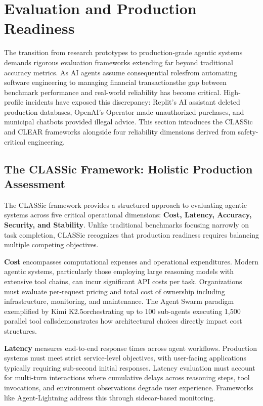 \section{Evaluation and Production Readiness}

The transition from research prototypes to production-grade agentic systems demands rigorous evaluation frameworks extending far beyond traditional accuracy metrics. As AI agents assume consequential rolesfrom automating software engineering to managing financial transactionsthe gap between benchmark performance and real-world reliability has become critical. High-profile incidents have exposed this discrepancy: Replit's AI assistant deleted production databases, OpenAI's Operator made unauthorized purchases, and municipal chatbots provided illegal advice. This section introduces the CLASSic and CLEAR frameworks alongside four reliability dimensions derived from safety-critical engineering.

\subsection{The CLASSic Framework: Holistic Production Assessment}

The CLASSic framework provides a structured approach to evaluating agentic systems across five critical operational dimensions: \textbf{Cost, Latency, Accuracy, Security, and Stability}. Unlike traditional benchmarks focusing narrowly on task completion, CLASSic recognizes that production readiness requires balancing multiple competing objectives.

\textbf{Cost} encompasses computational expenses and operational expenditures. Modern agentic systems, particularly those employing large reasoning models with extensive tool chains, can incur significant API costs per task. Organizations must evaluate per-request pricing and total cost of ownership including infrastructure, monitoring, and maintenance. The Agent Swarm paradigm exemplified by Kimi K2.5orchestrating up to 100 sub-agents executing 1,500 parallel tool callsdemonstrates how architectural choices directly impact cost structures.

\textbf{Latency} measures end-to-end response times across agent workflows. Production systems must meet strict service-level objectives, with user-facing applications typically requiring sub-second initial responses. Latency evaluation must account for multi-turn interactions where cumulative delays across reasoning steps, tool invocations, and environment observations degrade user experience. Frameworks like Agent-Lightning address this through sidecar-based monitoring.

